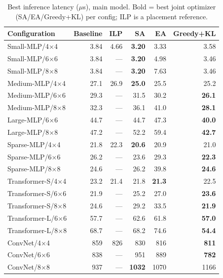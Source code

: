 \documentclass[conference]{IEEEtran}
\begin{document}
\begin{table}[t]
\centering
\caption{Best inference latency ($\mu$s), main model. Bold = best joint optimizer (SA/EA/Greedy+KL) per config; ILP is a placement reference.}
\label{tab:main}
\footnotesize
\setlength{\tabcolsep}{3.5pt}
\begin{tabular}{lrrrrr}
\toprule
Configuration & Baseline & ILP & SA & EA & Greedy+KL \\
\midrule
Small-MLP/4$\times$4   & 3.84 & 4.66 & \textbf{3.20} & 3.33 & 3.58 \\
Small-MLP/6$\times$6   & 3.84 & ---  & \textbf{3.20} & 4.98 & 3.46 \\
Small-MLP/8$\times$8   & 3.84 & ---  & \textbf{3.20} & 7.63 & 3.46 \\
Medium-MLP/4$\times$4  & 27.1 & 26.9 & \textbf{25.0} & 25.5 & 25.2 \\
Medium-MLP/6$\times$6  & 29.3 & ---  & 31.5 & 30.2 & \textbf{26.1} \\
Medium-MLP/8$\times$8  & 32.3 & ---  & 36.1 & 41.0 & \textbf{28.1} \\
Large-MLP/6$\times$6   & 44.7 & ---  & 44.7 & 47.3 & \textbf{40.0} \\
Large-MLP/8$\times$8   & 47.2 & ---  & 52.2 & 59.4 & \textbf{42.7} \\
Sparse-MLP/4$\times$4  & 21.8 & 22.3 & \textbf{20.6} & 20.9 & 21.0 \\
Sparse-MLP/6$\times$6  & 26.2 & ---  & 23.6 & 29.3 & \textbf{22.3} \\
Sparse-MLP/8$\times$8  & 24.6 & ---  & 26.2 & 39.8 & \textbf{24.6} \\
Transformer-S/4$\times$4 & 23.2 & 21.4 & 21.8 & \textbf{21.3} & 22.5 \\
Transformer-S/6$\times$6 & 21.9 & ---  & 25.2 & 27.0 & \textbf{23.6} \\
Transformer-S/8$\times$8 & 24.6 & ---  & 29.2 & 33.5 & \textbf{21.9} \\
Transformer-L/6$\times$6 & 57.7 & ---  & 62.6 & 61.8 & \textbf{57.0} \\
Transformer-L/8$\times$8 & 68.7 & ---  & 68.2 & 74.6 & \textbf{54.4} \\
ConvNet/4$\times$4      & 859  & 826  & 830  & 816 & \textbf{811} \\
ConvNet/6$\times$6      & 838  & ---  & 951  & 889 & \textbf{782} \\
ConvNet/8$\times$8      & 937  & ---  & \textbf{1032} & 1070 & 1166 \\
\bottomrule
\end{tabular}
\end{table}
\end{document}
